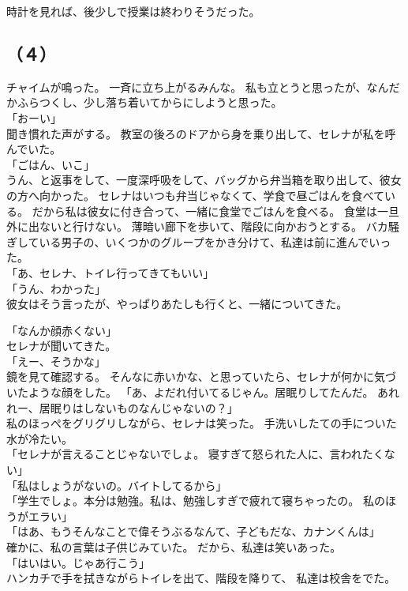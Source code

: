 \documentclass[../IHMain]{subfiles}
\begin{document}
時計を見れば、後少しで授業は終わりそうだった。

\subsection*{（４）}
チャイムが鳴った。
一斉に立ち上がるみんな。
私も立とうと思ったが、なんだかふらつくし、少し落ち着いてからにしようと思った。\\
「おーい」\\
聞き慣れた声がする。
教室の後ろのドアから身を乗り出して、セレナが私を呼んでいた。\\
「ごはん、いこ」\\
うん、と返事をして、一度深呼吸をして、バッグから弁当箱を取り出して、彼女の方へ向かった。
セレナはいつも弁当じゃなくて、学食で昼ごはんを食べている。
だから私は彼女に付き合って、一緒に食堂でごはんを食べる。
食堂は一旦外に出ないと行けない。
薄暗い廊下を歩いて、階段に向かおうとする。
バカ騒ぎしている男子の、いくつかのグループをかき分けて、私達は前に進んでいった。\\
「あ、セレナ、トイレ行ってきてもいい」\\
「うん、わかった」\\
彼女はそう言ったが、やっぱりあたしも行くと、一緒についてきた。

「なんか顔赤くない」\\
セレナが聞いてきた。\\
「えー、そうかな」\\
鏡を見て確認する。
そんなに赤いかな、と思っていたら、セレナが何かに気づいたような顔をした。
「あ、よだれ付いてるじゃん。居眠りしてたんだ。
あれれー、居眠りはしないものなんじゃないの？」\\
私のほっぺをグリグリしながら、セレナは笑った。
手洗いしたての手についた水が冷たい。\\
「セレナが言えることじゃないでしょ。
寝すぎて怒られた人に、言われたくない」\\
「私はしょうがないの。バイトしてるから」\\
「学生でしょ。本分は勉強。私は、勉強しすぎで疲れて寝ちゃったの。
私のほうがエラい」\\
「はあ、もうそんなことで偉そうぶるなんて、子どもだな、カナンくんは」\\
確かに、私の言葉は子供じみていた。
だから、私達は笑いあった。\\
「はいはい。じゃあ行こう」\\
ハンカチで手を拭きながらトイレを出て、階段を降りて、
私達は校舎をでた。\\
\end{document}
